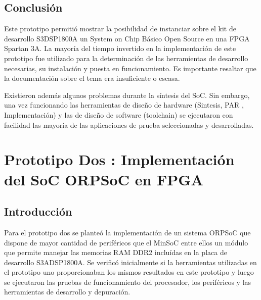 		\section{Conclusión}
		Este prototipo permitió mostrar la posibilidad de instanciar sobre el kit de desarrollo S3DSP1800A un System on Chip Básico Open Source en una FPGA
		Spartan 3A. La mayoría del tiempo invertido en la implementación de este prototipo fue utilizado para la determinación de las herramientas de
		desarrollo necesarias, su instalación y puesta en funcionamiento. Es importante resaltar que la documentación sobre el tema era insuficiente o
		escasa. 
		
		Existieron además algunos problemas durante la síntesis del SoC. Sin embargo, una vez funcionando las herramientas de diseño de hardware (Sintesis,
		PAR , Implementación) y las de diseño de software (toolchain) se ejecutaron con facilidad las mayoría de las aplicaciones de prueba seleccionadas y
		desarrolladas.
		
\newpage		
\chapter{Prototipo Dos : Implementación del SoC ORPSoC en FPGA}
		\section{Introducción}
		Para el prototipo dos se planteó la implementación de un sistema ORPSoC que dispone de mayor cantidad de periféricos que el MinSoC entre ellos un
		módulo que permite manejar las memorias RAM DDR2 incluídas en la placa de desarrollo S3ADSP1800A. Se verificó inicialmente si la herramientas
		utilizadas en el prototipo uno proporcionaban los mismos resultados en este prototipo y luego se ejecutaron las pruebas de funcionamiento del
		procesador, los periféricos y las herramientas de desarrollo y depuración. 
		
\newpage				
